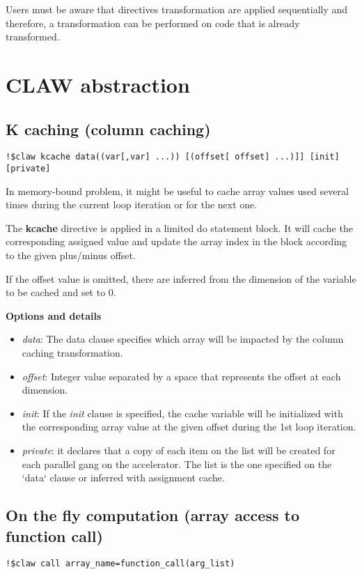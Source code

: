 \documentclass{article}
\begin{document}
Users must be aware that directives transformation are applied sequentially and
therefore, a transformation can be performed on code that is already transformed.

\section{CLAW abstraction}

\subsection{K caching (column caching)}
\begin{lstlisting}
!$claw kcache data((var[,var] ...)) [(offset[ offset] ...)]] [init] [private]
\end{lstlisting}

In memory-bound problem, it might be useful to cache array values used several times during the current loop iteration or for the next one.

The \textbf{kcache} directive is applied in a limited do statement block. It will cache the corresponding assigned value and update
the array index in the block according to the given plus/minus offset.

If the offset value is omitted, there are inferred from the dimension of the variable to be cached and set to 0.

\textbf{Options and details}
\begin{itemize}
\item \textit{data}: The data clause specifies which array will be impacted by the column caching transformation. 
\item \textit{offset}: Integer value separated by a space that represents the offset at each dimension. 
\item \textit{init}: If the \textit{init} clause is specified, the cache variable will be initialized with the corresponding array value at the given offset during the 1st loop iteration. 
\item \textit{private}: it declares that a copy of each item on the list will be created
for each parallel gang on the accelerator. The list is the one specified on
the `data` clause or inferred with assignment cache.
\end{itemize}




\subsection{On the fly computation (array access to function call)}
\begin{lstlisting}
!$claw call array_name=function_call(arg_list)
\end{lstlisting}
\end{document}
